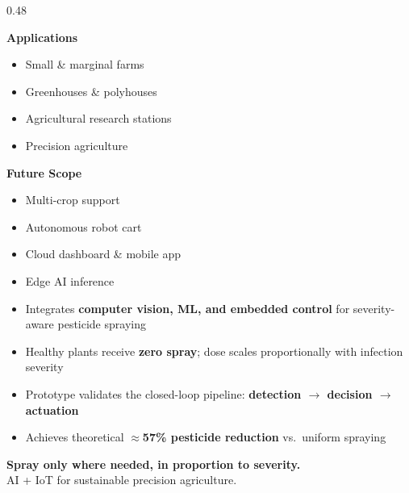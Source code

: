 \documentclass[final,t]{beamer}
\newcommand{\hlgood}[1]{\textbf{\textcolor{GreenGood}{#1}}}
\begin{document}
\begin{frame}[t]{}
\begin{columns}[T]
\begin{column}{0.48\textwidth}
\begin{posterbox}[title=8~~Applications \& Future Scope, colbacktitle=AccentBlue]
\begin{minipage}[t]{0.47\linewidth}
  {\large\bfseries\color{AccentGreen}Applications}
  \begin{itemize}[itemsep=4pt]
    \item Small \& marginal farms
    \item Greenhouses \& polyhouses
    \item Agricultural research stations
    \item Precision agriculture
  \end{itemize}
\end{minipage}\hfill
\begin{minipage}[t]{0.47\linewidth}
  {\large\bfseries\color{AccentBlue}Future Scope}
  \begin{itemize}[itemsep=4pt]
    \item Multi-crop support
    \item Autonomous robot cart
    \item Cloud dashboard \& mobile app
    \item Edge AI inference
  \end{itemize}
\end{minipage}
\end{posterbox}

\vspace{0.4cm}

\begin{posterbox}[title=9~~Conclusion, colbacktitle=HeaderBG]
\justifying
\begin{itemize}
  \item Integrates \textbf{computer vision, ML, and embedded control} for severity-aware pesticide spraying
  \item Healthy plants receive \textbf{zero spray}; dose scales proportionally with infection severity
  \item Prototype validates the closed-loop pipeline: \textbf{detection $\to$ decision $\to$ actuation}
  \item Achieves theoretical \hlgood{$\approx$57\% pesticide reduction} vs.\ uniform spraying
\end{itemize}

\vspace{0.4em}
\begin{resultbox}
\centering\large
\textbf{Spray only where needed, in proportion to severity.}\\[3pt]
AI + IoT for sustainable precision agriculture.
\end{resultbox}
\end{posterbox}


\end{column}
\end{columns}
\end{frame}
\end{document}

